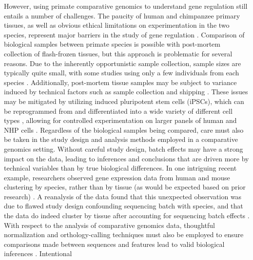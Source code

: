 {However, using primate comparative genomics to understand gene regulation still entails a number of challenges. The paucity of human and chimpanzee primary tissues, as well as obvious ethical limitations on experimentation in the two species, represent major barriers in the study of gene regulation \cite{Romero, Ruvinsky, and Gilad 2012}. Comparison of biological samples between primate species is possible with post-mortem collection of flash-frozen tissues, but this approach is problematic for several reasons. Due to the inherently opportunistic sample collection, sample sizes are typically quite small, with some studies using only a few individuals from each species \cite{Blekhman et al 2008 (Gene regulation in primates evolves under...), Pai et al 2011 (A genome-wide study of DNA methylation), Prescott et al 2015 (Enhancer Divergence...Chimp Neural Crest)}. Additionally, post-mortem tissue samples may be subject to variance induced by technical factors such as sample collection and shipping \cite{Blake et al. 2020 (A comparison of gene expression and DNA methylation), Chevyreva et al. 2007 (Assessing RNA quality in postmortem human brain tissue)}. These issues may be mitigated by utilizing induced pluripotent stem cells (iPSCs), which can be reprogrammed from and differentiated into a wide variety of different cell types \cite{Takahashi & Yamanaka 2006, Takahashi et al. 2007 (Induction of pluripotent stem cells...), Sun et al 2009 (Feeder-free derivation...))}, allowing for controlled experimentation on larger panels of human and NHP cells \cite{Romero et al 2015 (A panel of induced pluripotent stem cells from chimpanzees...), Marchetto et al. 2013 (Differential L1 regulation...)}. Regardless of the biological samples being compared, care must also be taken in the study design and analysis methods employed in a comparative genomics setting. Without careful study design, batch effects may have a strong impact on the data, leading to inferences and conclusions that are driven more by technical variables than by true biological differences. In one intriguing recent example, researchers observed gene expression data from human and mouse clustering by species, rather than by tissue (as would be expected based on prior research) \cite{Mouse ENCODE Consoritum, An Encyclopedia of DNA Elements in the Mouse Genome}. A reanalysis of the data found that this unexpected observation was due to flawed study design confounding sequencing batch with species, and that the data do indeed cluster by tissue after accounting for sequencing batch effects \cite{Gilad and Mizrahi-Man 2015}. With respect to the analysis of comparative genomics data, thoughtful normalization and orthology-calling techniques must also be employed to ensure comparisons made between sequences and features lead to valid biological inferences \cite{Vallender 2009 (Bioinformatics approaches to identifying orthologs and assessing evolutionary relationships), Zhou et al. 2019 (A statistical normalization method and differential expression analysis for RNA-seq data between different species), Blekhman et al. 2010 (Sex-specific and lineage-specific alternative splicing in primates), Cain et al. 2011 (Gene expression differences among primates are associated with changes in a histone epigenetic modification)}. Intentional }
